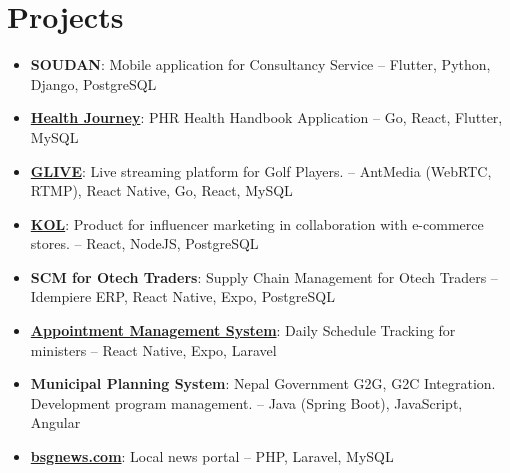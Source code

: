 \documentclass[letterpaper,11pt]{article}
\newcommand{\resumeSubItem}[2]{\item\small{
		{\textbf{#1}}{: #2 \vspace{-2pt}}
	}\vspace{-4pt}}
\newcommand{\resumeSubHeadingListStart}{\begin{itemize}[leftmargin=*]}
\newcommand{\resumeSubHeadingListEnd}{\end{itemize}}
\begin{document}
	\section{Projects}
	\resumeSubHeadingListStart
	\resumeSubItem{SOUDAN}
	{Mobile application for Consultancy Service -- Flutter, Python, Django, PostgreSQL}
	\resumeSubItem{\href{https://health-journey.jp/}{Health Journey}}
	{PHR Health Handbook Application -- Go, React, Flutter, MySQL}
	\resumeSubItem{\href{https://www.glive-official.co.jp/}{GLIVE}}
	{Live streaming platform for Golf Players. -- AntMedia (WebRTC, RTMP), React Native, Go, React, MySQL}
	\resumeSubItem{\href{https://kol-tech.co.jp/}{KOL}}
	{Product for influencer marketing in collaboration with e-commerce stores. -- React, NodeJS, PostgreSQL}
	\resumeSubItem{SCM for Otech Traders}
	{Supply Chain Management for Otech Traders -- Idempiere ERP, React Native, Expo, PostgreSQL}
	\resumeSubItem{\href{https://play.google.com/store/apps/details?id=com.phoenix.tourism_ministry.appointment&hl=en_us}{Appointment Management System}}
	{Daily Schedule Tracking for ministers -- React Native, Expo, Laravel}
	\resumeSubItem{Municipal Planning System}
	{Nepal Government G2G, G2C Integration. Development program management. -- Java (Spring Boot), JavaScript, Angular}
	\resumeSubItem{\href{https://bsgnews.com}{bsgnews.com}}
	{Local news portal -- PHP, Laravel, MySQL}
	\resumeSubHeadingListEnd
	
	
	
\end{document}
